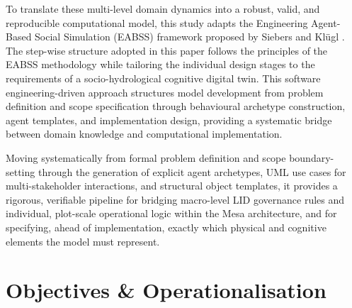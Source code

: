 \documentclass{article}
\begin{document}
To translate these multi-level domain dynamics into a robust, valid, and reproducible computational model, this study adapts the Engineering Agent-Based Social Simulation (EABSS) framework proposed by Siebers and Kl\"ugl \cite{SiebersKluegl}. The step-wise structure adopted in this paper follows the principles of the EABSS methodology while tailoring the individual design stages to the requirements of a socio-hydrological cognitive digital twin. This software engineering-driven approach structures model development from problem definition and scope specification through behavioural archetype construction, agent templates, and implementation design, providing a systematic bridge between domain knowledge and computational implementation.
\begin{changed}
Moving systematically from formal problem definition and scope boundary-setting through the generation of explicit agent archetypes, UML use cases for multi-stakeholder interactions, and structural object templates, it provides a rigorous, verifiable pipeline for bridging macro-level LID governance rules and individual, plot-scale operational logic within the Mesa architecture, and for specifying, ahead of implementation, exactly which physical and cognitive elements the model must represent.
\end{changed}

\section{Objectives \& Operationalisation}
\label{sec:objectives}
\end{document}
